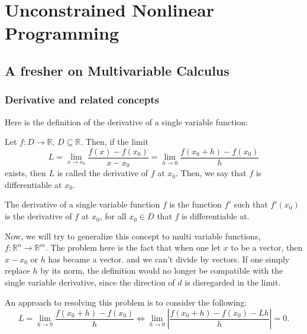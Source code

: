 \chapter{Unconstrained Nonlinear Programming} %
\label{chap:Unconstrained Nonlinear Programming}

\section{A fresher on Multivariable Calculus} %
\label{sec:A fresher on Multivariable Calculus}

\subsection{Derivative and related concepts} %
\label{sub:Derivative and related concepts}

Here is the definition of the derivative of a single variable function:
\begin{definition}
\label{def:Derivative of single variable functions}
  Let \( f: D \to  \mathbb{R} \), \( D \subseteq \mathbb{R} \). Then, if the
  limit
  \[
    L = \lim_{x \to x_{0}} \frac{f(x) - f(x_{0})}{x - x_{0}} = \lim_{h \to 0}
    \frac{f(x_{0} + h) - f(x_{0})}{h}
  \] exists, then \( L \) is called the derivative of \( f \) at \( x_{0} \).
  Then, we say that \( f \) is differentiable at \( x_{0} \).

  The derivative of a single variable function \( f \) is the function \( f' \)
  such that \( f'(x_{0}) \) is the derivative of \( f \) at \( x_{0} \), for all
  \( x_{0} \in D \) that \( f \) is differentiable at.
\end{definition}

Now, we will try to generalize this concept to multi variable functions, \( f:
\mathbb{R}^{n} \to  \mathbb{R}^{m} \). The problem here is the fact that when
one let \( x \) to be a vector, then \( x - x_{0} \) or \( h \) has became a
vector. and we can't divide by vectors. If one simply replace \( h \) by its
norm, the definition would no longer be compatible with the single variable
derivative, since the direction of \( d \) is disregarded in the limit.

An approach to resolving this problem is to consider the following:
\[
  L = \lim_{h \to 0} \frac{f(x_{0} + h) - f(x_{0})}{h} \iff \lim_{h \to 0}
  \left| \frac{f(x_{0} + h) - f(x_{0}) - Lh}{h} \right|  = 0
.\] 

